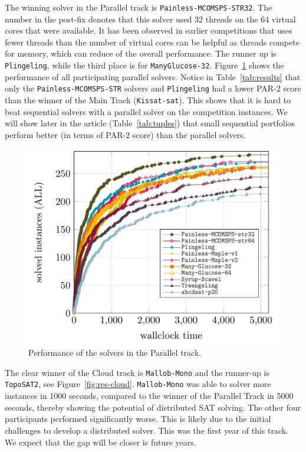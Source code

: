 \documentclass{elsarticle}
\newcommand{\solver}[1]{\texttt{#1}}
\begin{document}
The winning solver in the Parallel track is \solver{Painless-MCOMSPS-STR32}. The number in the post-fix denotes
that this solver used 32 threads on the 64 virtual cores that were available. It has been observed in earlier 
competitions that uses fewer threads than the number of virtual cores can be helpful as threads compete 
for memory, which can reduce of the overall performance. The runner up is \solver{Plingeling}, while the
third place is for \solver{ManyGlucose-32}. Figure~\ref{fig:res-parallel} shows the performance of
all participating parallel solvers. Notice in Table~\ref{tab:results} that only the \solver{Painless-MCOMSPS-STR} solvers
and \solver{Plingeling} had a lower PAR-2 score than the winner of the Main Track (\solver{Kissat-sat}). 
This shows that it is hard to beat sequential solvers with a parallel solver on the competition instances. 
We will show later in the article (Table~\ref{tab:tuples}) that small sequential portfolios 
perform better (in terms of PAR-2 score) than the parallel solvers. 

\begin{figure}[ht]
\centering
\includegraphics[width=.9\textwidth]{img/parallel-ALL.pdf}
\caption{Performance of the solvers in the Parallel track.}
\label{fig:res-parallel}
\end{figure}

The clear winner of the Cloud track is \solver{Mallob-Mono} and the runner-up is \solver{TopoSAT2},
see Figure~\ref{fig:res-cloud}.
\solver{Mallob-Mono} was able to solver more instances in 1000 seconds, compared to the 
winner of the Parallel Track in 5000 seconds, thereby showing the potential of distributed SAT solving. 
The other four participants performed significantly worse. This is likely due to the initial challenges
to develop a distributed solver. This was the first year of this track. We expect that the gap will be 
closer is future years. 
\end{document}
